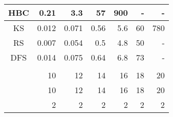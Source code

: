 \begin{table}
\begin{minipage}{167pt}
\begin{center}
\begin{tabular}[c]{| r | r | r | r | r | r | r |}
\multicolumn{1}{|c||}{HBC} & 0.21 & 3.3 & 57 & 900 & - & -\\\hline
\multicolumn{1}{|c||}{KS} & 0.012 & 0.071 & 0.56 & 5.6 & 60 & 780\\\hline
\multicolumn{1}{|c||}{RS} &0.007 & 0.054 & 0.5 & 4.8 & 50 & -\\\hline
\multicolumn{1}{|c||}{DFS} &0.014 & 0.075 & 0.64 & 6.8 & 73 & -\\\hline\hline
\multicolumn{1}{|c||}{} &&&&&&\\\hline
\multicolumn{1}{|c||}{} & 10 & 12 & 14 & 16 & 18 & 20\\\hline
\multicolumn{1}{|c||}{} & 10 & 12 & 14 & 16 & 18 & 20\\\hline
\multicolumn{1}{|c||}{} & 2 & 2 & 2 & 2 & 2 & 2\\\hline
\end{tabular}
\end{center}
\end{minipage}
\end{table} 

